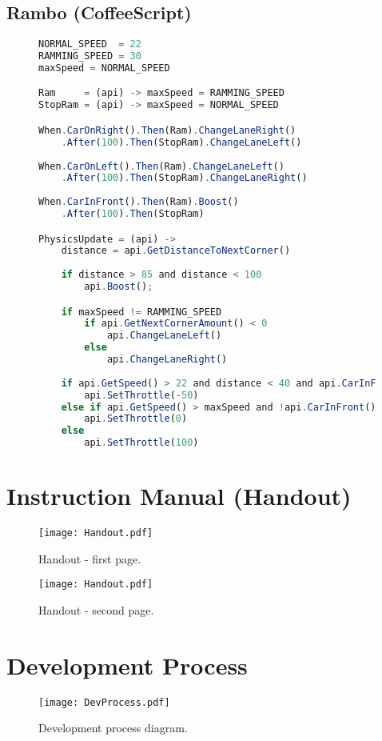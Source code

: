 \subsection{Rambo (CoffeeScript)}
\begin{figure}[H]
\begin{lstlisting}[language=JavaScript]
NORMAL_SPEED  = 22
RAMMING_SPEED = 30
maxSpeed = NORMAL_SPEED

Ram     = (api) -> maxSpeed = RAMMING_SPEED
StopRam = (api) -> maxSpeed = NORMAL_SPEED

When.CarOnRight().Then(Ram).ChangeLaneRight()
    .After(100).Then(StopRam).ChangeLaneLeft()
    
When.CarOnLeft().Then(Ram).ChangeLaneLeft()
    .After(100).Then(StopRam).ChangeLaneRight()
    
When.CarInFront().Then(Ram).Boost()
    .After(100).Then(StopRam)

PhysicsUpdate = (api) -> 
    distance = api.GetDistanceToNextCorner() 
    
    if distance > 85 and distance < 100 
        api.Boost(); 

    if maxSpeed != RAMMING_SPEED 
        if api.GetNextCornerAmount() < 0 
            api.ChangeLaneLeft() 
        else
            api.ChangeLaneRight()
    
    if api.GetSpeed() > 22 and distance < 40 and api.CarInFront() 
        api.SetThrottle(-50) 
    else if api.GetSpeed() > maxSpeed and !api.CarInFront() 
        api.SetThrottle(0) 
    else
        api.SetThrottle(100)
\end{lstlisting}
\end{figure}

\section{Instruction Manual (Handout)}

\begin{figure}[H]
\centering
\texttt{[image: Handout.pdf]}
\caption{Handout - first page.}
\end{figure}
\begin{figure}[H]
\centering
\texttt{[image: Handout.pdf]}
\caption{Handout - second page.}
\end{figure}

\section{Development Process}

\begin{figure}[H]
\centering
\texttt{[image: DevProcess.pdf]}
\caption{Development process diagram.}
\end{figure}